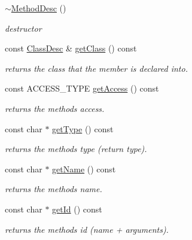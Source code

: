 \begin{DoxyCompactItemize}
\item 
\hyperlink{classagm_1_1reflection_1_1_method_desc_a5f7e3fceb563a4352be08f6b444c5359}{$\sim$\+Method\+Desc} ()\hypertarget{classagm_1_1reflection_1_1_method_desc_a5f7e3fceb563a4352be08f6b444c5359}{}\label{classagm_1_1reflection_1_1_method_desc_a5f7e3fceb563a4352be08f6b444c5359}

\begin{DoxyCompactList}\small\item\em destructor \end{DoxyCompactList}\item 
const \hyperlink{classagm_1_1reflection_1_1_class_desc}{Class\+Desc} \& \hyperlink{classagm_1_1reflection_1_1_method_desc_a205ca3b9cd08e85c557bb54438d3bf92}{get\+Class} () const 
\begin{DoxyCompactList}\small\item\em returns the class that the member is declared into. \end{DoxyCompactList}\item 
const A\+C\+C\+E\+S\+S\+\_\+\+T\+Y\+PE \hyperlink{classagm_1_1reflection_1_1_method_desc_ac52cb29de4e8dba4833f052dc88f136f}{get\+Access} () const 
\begin{DoxyCompactList}\small\item\em returns the method\textquotesingle{}s access. \end{DoxyCompactList}\item 
const char $\ast$ \hyperlink{classagm_1_1reflection_1_1_method_desc_a2dc69fd8feb410be5f4489acc102a9a0}{get\+Type} () const 
\begin{DoxyCompactList}\small\item\em returns the method\textquotesingle{}s type (return type). \end{DoxyCompactList}\item 
const char $\ast$ \hyperlink{classagm_1_1reflection_1_1_method_desc_a85533cb0a86c116aa7d6bc3d56858929}{get\+Name} () const 
\begin{DoxyCompactList}\small\item\em returns the method\textquotesingle{}s name. \end{DoxyCompactList}\item 
const char $\ast$ \hyperlink{classagm_1_1reflection_1_1_method_desc_a0b366083d02cb631c838daec5a53cd1b}{get\+Id} () const 
\begin{DoxyCompactList}\small\item\em returns the method\textquotesingle{}s id (name + arguments). \end{DoxyCompactList}\item 

\end{DoxyCompactItemize}

